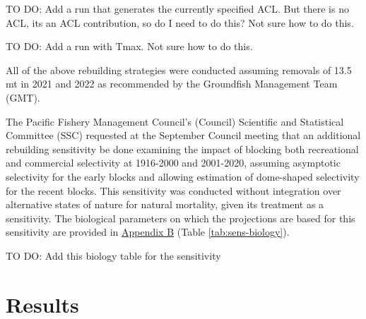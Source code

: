 \documentclass[11pt,
  english,
  a4paper,
]{article}
\begin{document}

TO DO: Add a run that generates the currently specified ACL. But there is no ACL, its an ACL contribution, so do I need to do this? Not sure how to do this.

\leavevmode\tagmcend\tagstructend\par


TO DO: Add a run with Tmax. Not sure how to do this.

\leavevmode\tagmcend\tagstructend\par


All of the above rebuilding strategies were conducted assuming removals of 13.5 mt in 2021 and 2022 as recommended by the Groundfish Management Team (GMT).

\leavevmode\tagmcend\tagstructend\par


The Pacific Fishery Management Council's (Council) Scientific and Statistical Committee (SSC) requested at the September Council meeting that an additional rebuilding sensitivity be done examining the impact of blocking both recreational and commercial selectivity at 1916-2000 and 2001-2020, assuming asymptotic selectivity for the early blocks and allowing estimation of dome-shaped selectivity for the recent blocks. This sensitivity was conducted without integration over alternative states of nature for natural mortality, given its treatment as a sensitivity. The biological parameters on which the projections are based for this sensitivity are provided in {\protect\hyperlink{append_b}{Appendix B}\leavevmode\tagmcend\tagstructend} (Table \ref{tab:sens-biology}).

\leavevmode\tagmcend\tagstructend\par


TO DO: Add this biology table for the sensitivity

\leavevmode\tagmcend\tagstructend\par


\hypertarget{results}{%
\section{Results}\label{results}}
\end{document}
